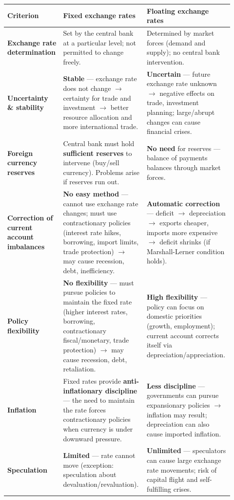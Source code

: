 \begin{center}
\renewcommand{\arraystretch}{1.4}
\footnotesize
\begin{tabular}{p{0.2\linewidth}|p{0.36\linewidth}|p{0.36\linewidth}}
\toprule
\textbf{Criterion} & \textbf{Fixed exchange rates} & \textbf{Floating exchange rates} \\
\midrule
\textbf{Exchange rate determination} & Set by the central bank at a particular level; not permitted to change freely. & Determined by market forces (demand and supply); no central bank intervention. \\
\textbf{Uncertainty \& stability} & \textbf{Stable} --- exchange rate does not change $\to$ certainty for trade and investment $\to$ better resource allocation and more international trade. & \textbf{Uncertain} --- future exchange rate unknown $\to$ negative effects on trade, investment planning; large/abrupt changes can cause financial crises. \\
\textbf{Foreign currency reserves} & Central bank must hold \textbf{sufficient reserves} to intervene (buy/sell currency). Problems arise if reserves run out. & \textbf{No need} for reserves --- balance of payments balances through market forces. \\
\textbf{Correction of current account imbalances} & \textbf{No easy method} --- cannot use exchange rate changes; must use contractionary policies (interest rate hikes, borrowing, import limits, trade protection) $\to$ may cause recession, debt, inefficiency. & \textbf{Automatic correction} --- deficit $\to$ depreciation $\to$ exports cheaper, imports more expensive $\to$ deficit shrinks (if Marshall-Lerner condition holds). \\
\textbf{Policy flexibility} & \textbf{No flexibility} --- must pursue policies to maintain the fixed rate (higher interest rates, borrowing, contractionary fiscal/monetary, trade protection) $\to$ may cause recession, debt, retaliation. & \textbf{High flexibility} --- policy can focus on domestic priorities (growth, employment); current account corrects itself via depreciation/appreciation. \\
\textbf{Inflation} & Fixed rates provide \textbf{anti-inflationary discipline} --- the need to maintain the rate forces contractionary policies when currency is under downward pressure. & \textbf{Less discipline} --- governments can pursue expansionary policies $\to$ inflation may result; depreciation can also cause imported inflation. \\
\textbf{Speculation} & \textbf{Limited} --- rate cannot move (exception: speculation about devaluation/revaluation). & \textbf{Unlimited} --- speculators can cause large exchange rate movements; risk of capital flight and self-fulfilling crises. \\

\end{tabular}
\end{center}
